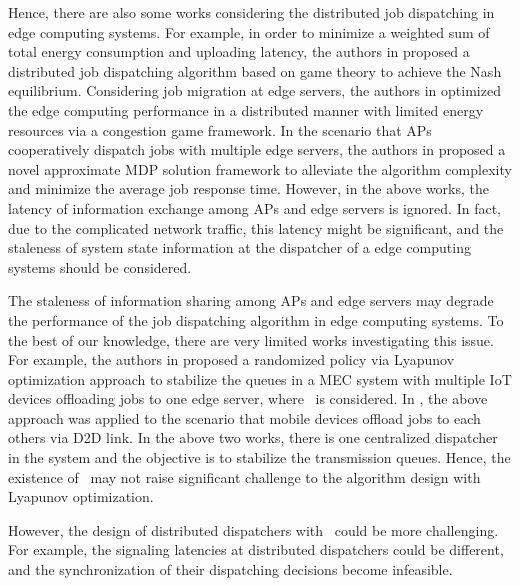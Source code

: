Hence, there are also some works considering the distributed job dispatching in edge computing systems.
For example, in order to minimize a weighted sum of total energy consumption and uploading latency, the authors in \cite{ToN-Xuchen2016} proposed a distributed job dispatching algorithm based on game theory to achieve the Nash equilibrium. 
Considering job migration at edge servers, the authors in \cite{ToN-xujie2018} optimized the edge computing performance in a distributed manner with limited energy resources via a congestion game framework.
In the scenario that APs cooperatively dispatch jobs with multiple edge servers, the authors in \cite{mdp-jcin} proposed a novel approximate MDP solution framework to alleviate the algorithm complexity and minimize the average job response time.
However, in the above works, the latency of information exchange among APs and edge servers is ignored.
In fact, due to the complicated network traffic, this latency might be significant, and the staleness of system state information at the dispatcher of a edge computing systems should be considered.

The staleness of information sharing among APs and edge servers may degrade the performance of the job dispatching algorithm in edge computing systems.
To the best of our knowledge, there are very limited works investigating this issue.
For example, the authors in \cite{JSAC17-LyuX} proposed a randomized policy via Lyapunov optimization approach to stabilize the queues in a MEC system with multiple IoT devices offloading jobs to one edge server, where \brlatency~is considered. 
In \cite{TWC18-LyuX}, the above approach was applied to the scenario that mobile devices offload jobs to each others via D2D link.
In the above two works, there is one centralized dispatcher in the system and the objective is to stabilize the transmission queues.
Hence, the existence of \brlatency~may not raise significant challenge to the algorithm design with Lyapunov optimization.

However, the design of distributed dispatchers with \brlatency~could be more challenging.
For example, the signaling latencies at distributed dispatchers could be different, and the synchronization of their dispatching decisions become infeasible.
